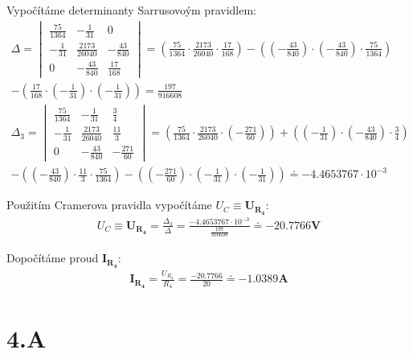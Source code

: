 \documentclass[12pt,a4paper]{article}
\begin{document}
	Vypočítáme determinanty Sarrusovoým pravidlem:
	\begin{gather*}
		\Delta =
		\begin{vmatrix}
			\frac{75}{1364}	&	-\frac{1}{31}		  &	0 \\[6pt]
			-\frac{1}{31} 	&	\frac{2173}{26040}    &	-\frac{43}{840} \\[6pt]
			0				&	-\frac{43}{840} 	  &	\frac{17}{168}
		\end{vmatrix}
		=
		(\frac{75}{1364} \cdot \frac{2173}{26040} \cdot \frac{17}{168})
		- ((-\frac{43}{840}) \cdot (-\frac{43}{840}) \cdot \frac{75}{1364}) \\
		- (\frac{17}{168} \cdot (-\frac{1}{31}) \cdot (-\frac{1}{31})) = \frac{197}{916608}
		\\
		\Delta_3 =
		\begin{vmatrix}
			\frac{75}{1364}	&	-\frac{1}{31}		  &	\frac{3}{4} \\[6pt]
			-\frac{1}{31} 	&	\frac{2173}{26040}    &	\frac{11}{3} \\[6pt]
			0				&	-\frac{43}{840} 	  &	-\frac{271}{60}
		\end{vmatrix}
		=
		(\frac{75}{1364} \cdot \frac{2173}{26040} \cdot (-\frac{271}{60}))
		+ ((-\frac{1}{31}) \cdot (-\frac{43}{840}) \cdot \frac{3}{4}) \\
		- ((-\frac{43}{840}) \cdot \frac{11}{3} \cdot \frac{75}{1364})
		- ((-\frac{271}{60}) \cdot (-\frac{1}{31}) \cdot (-\frac{1}{31}))
		\doteq -4.4653767 \cdot 10^{-3}
	\end{gather*}

	Použitím Cramerova pravidla vypočítáme $U_C \equiv \boldsymbol{U_{R_4}}$:
	\begin{gather*}
		U_C \equiv \boldsymbol{U_{R_4}} = \frac{\Delta_3}{\Delta} = \frac{-4.4653767 \cdot 10^{-3}}{\frac{197}{916608}}
		\doteq \boldsymbol{-20.7766 \textbf{V}}
	\end{gather*}

	Dopočítáme proud $\boldsymbol{I_{R_4}}$:
	\begin{gather*}
		\boldsymbol{I_{R_4}} = \frac{U_{R_4}}{R_4} = \frac{-20.7766}{20} \doteq \boldsymbol{-1.0389 \textbf{A}}
	\end{gather*}

	\newpage


	\section*{4.A}
\end{document}
